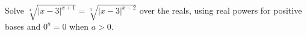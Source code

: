 Solve $\sqrt[4]{|x-3|^{x+1}}=\sqrt[3]{|x-3|^{x-2}}$ over the reals, using real powers for positive bases and $ 0^a=0 $ when $ a>0 $.
